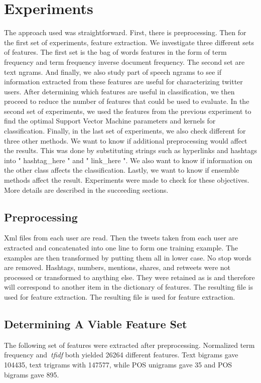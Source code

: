 \documentclass[a4paper]{llncs}
\begin{document}
\section{Experiments}
The approach used was straightforward. First, there is preprocessing. Then for the first set of experiments, feature extraction. We investigate three different sets of features. The first set is the bag of words features in the form of term frequency and term frequency inverse document frequency. The second set are text ngrams. And finally, we also study part of speech ngrams to see if information extracted from these features are useful for characterizing twitter users. After determining which features are useful in classification, we then proceed to reduce the number of features that could be used to evaluate. In the second set of experiments, we used the features from the previous experiment to find the optimal Support Vector Machine parameters and kernels for classification. Finally, in the last set of experiments, we also check different for three other methods. We want to know if additional preprocessing would affect the results. This was done by substituting strings such as hyperlinks and hashtags into " hashtag\_here " and " link\_here ". We also want to know if information on the other class affects the classification. Lastly, we want to know if ensemble methods affect the result. Experiments were made to check for these objectives. More details are described in the succeeding sections.


\subsection{Preprocessing}
Xml files from each user are read. Then the tweets taken from each user are extracted and concatenated into one line to form one training example. The examples are then transformed by putting them all in lower case. No stop words are removed. Hashtags, numbers, mentions, shares, and retweets were not processed or transformed to anything else. They were retained as is and therefore will correspond to another item in the dictionary of features. The resulting file is used for feature extraction.  The resulting file is used for feature extraction.  

\subsection{Determining A Viable Feature Set}

The following set of features were extracted after preprocessing. Normalized term frequency and~\textit{tfidf} both yielded 26264 different features. Text bigrams gave 104435, text trigrams with 147577, while POS unigrams gave 35 and POS bigrams gave 895.
\end{document}
